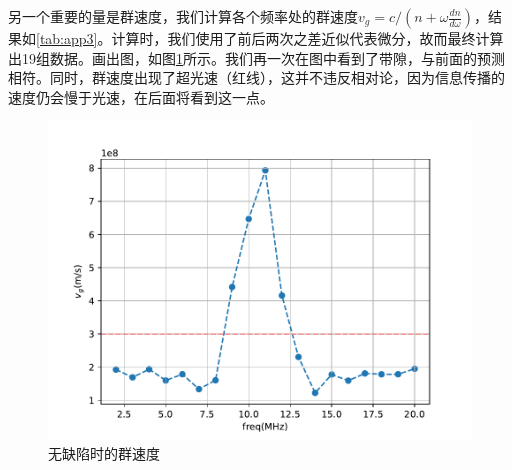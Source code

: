 \documentclass[fleqn,10pt]{SelfArx} %
\begin{document}
另一个重要的量是群速度，我们计算各个频率处的群速度$v_g=c/(n+\omega\frac{dn}{d\omega})$，结果如\ref{tab:app3}。计算时，我们使用了前后两次之差近似代表微分，故而最终计算出19组数据。画出图，如图\ref{fig:a2}所示。我们再一次在图中看到了带隙，与前面的预测相符。同时，群速度出现了超光速（红线），这并不违反相对论，因为信息传播的速度仍会慢于光速，在后面将看到这一点。
\begin{figure}[htbp]
	\centering
	\includegraphics[width=\linewidth]{C1-vg.pdf}
	\caption{无缺陷时的群速度}
	\label{fig:a2}
\end{figure}
\end{document}
